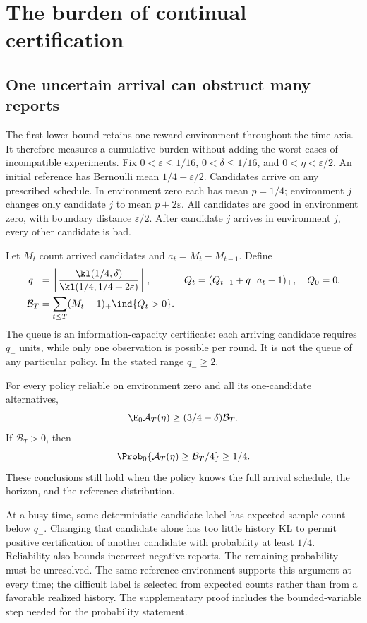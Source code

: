 \section{The burden of continual certification}
\label{sec:maintenance}

\subsection{One uncertain arrival can obstruct many reports}

The first lower bound retains one reward environment throughout the time axis.
It therefore measures a cumulative burden without adding the worst cases of
incompatible experiments. Fix
$0<\varepsilon\le1/16$, $0<\delta\le1/16$, and $0<\eta<\varepsilon/2$.
An initial reference has Bernoulli mean $1/4+\varepsilon/2$. Candidates arrive
on any prescribed schedule. In environment zero each has mean $p=1/4$;
environment $j$ changes only candidate $j$ to mean $p+2\varepsilon$.
All candidates are good in environment zero, with boundary distance
$\varepsilon/2$. After candidate $j$ arrives in environment $j$, every other
candidate is bad.

Let $M_t$ count arrived candidates and $a_t=M_t-M_{t-1}$. Define
\begin{align}
 q_-&=\left\lfloor\frac{\kl(1/4,\delta)}
                              {\kl(1/4,1/4+2\varepsilon)}\right\rfloor,
 &Q_t&=(Q_{t-1}+q_-a_t-1)_+,\quad Q_0=0,\notag\\
 \mathcal B_T&=\sum_{t\le T}(M_t-1)_+\ind\{Q_t>0\}.
 \label{eq:broadcast_queue}
\end{align}
The queue is an information-capacity certificate: each arriving candidate
requires $q_-$ units, while only one observation is possible per round. It is
not the queue of any particular policy. In the stated range $q_-\ge2$.

\begin{theorem}
\label{thm:broadcast}
For every policy reliable on environment zero and all its one-candidate
alternatives,
\[
 \E_0\mathcal A_T(\eta)\ge(3/4-\delta)\mathcal B_T.
\]
If $\mathcal B_T>0$, then
\[
 \Prob_0\{\mathcal A_T(\eta)\ge\mathcal B_T/4\}\ge1/4.
\]
These conclusions still hold when the policy knows the full arrival schedule,
the horizon, and the reference distribution.
\end{theorem}

At a busy time, some deterministic candidate label has expected sample count
below $q_-$. Changing that candidate alone has too little history KL to permit
positive certification of another candidate with probability at least $1/4$.
Reliability also bounds incorrect negative reports. The remaining probability
must be unresolved. The same reference environment supports this argument at
every time; the difficult label is selected from expected counts rather than
from a favorable realized history. The supplementary proof includes the
bounded-variable step needed for the probability statement.

